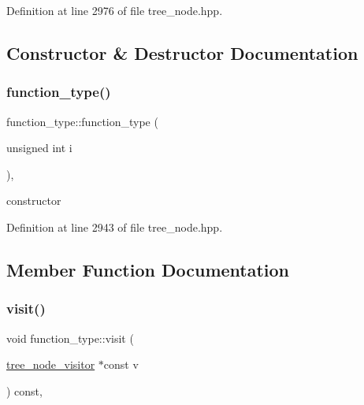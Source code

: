 Definition at line 2976 of file tree\+\_\+node.\+hpp.



\subsection{Constructor \& Destructor Documentation}
\mbox{\label{structfunction__type_a9e27d80b9aea8a3f1093ba631d0b054f}} 
\subsubsection{\texorpdfstring{function\+\_\+type()}{function\_type()}}
{\footnotesize\ttfamily function\+\_\+type\+::function\+\_\+type (\begin{DoxyParamCaption}\item[{unsigned int}]{i }\end{DoxyParamCaption})\hspace{0.3cm}{\ttfamily [inline]}, {\ttfamily [explicit]}}



constructor 



Definition at line 2943 of file tree\+\_\+node.\+hpp.



\subsection{Member Function Documentation}
\mbox{\label{structfunction__type_a7cfe2e272e5280c9c280b180e3a21c2b}} 
\subsubsection{\texorpdfstring{visit()}{visit()}}
{\footnotesize\ttfamily void function\+\_\+type\+::visit (\begin{DoxyParamCaption}\item[{\hyperlink{classtree__node__visitor}{tree\+\_\+node\+\_\+visitor} $\ast$const}]{v }\end{DoxyParamCaption}) const\hspace{0.3cm}{\ttfamily [override]}, {\ttfamily [virtual]}}



